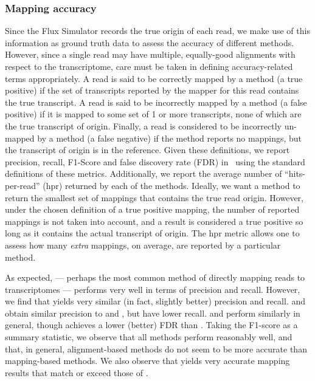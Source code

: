 \subsubsection{Mapping accuracy}
\label{subsec:synth_accuracy}

Since the Flux Simulator records the true origin of each read, we make use of this information as ground truth data to assess the accuracy of different methods. However, since a single read may have multiple, equally-good alignments with respect to the transcriptome, care must be taken in defining accuracy-related terms appropriately.  A read is said to be correctly mapped by a method (a true positive) if the set of transcripts reported by the mapper for this read contains the true transcript.  A read is said to be incorrectly mapped by a method (a false positive) if it is mapped to some set of 1 or more transcripts, none of which are the true transcript of origin.  Finally, a read is considered to be incorrectly un-mapped by a method (a false negative) if the method reports no mappings, but the transcript of origin is in the reference. Given these definitions, we report precision, recall, F1-Score and false discovery rate (FDR) in~ using the standard definitions of these metrics.  Additionally, we report the average number of ``hits-per-read'' (hpr) returned by each of the methods.  Ideally, we want a method to return the smallest set of mappings that contains the true read origin.  However, under the chosen definition of a true positive mapping, the number of reported mappings is not taken into account, and a result is considered a true positive so long as it contains the actual transcript of origin.  The hpr metric allows one to assess how many \textit{extra} mappings, on average, are reported by a particular method.

As expected, \bt --- perhaps the most common method of directly mapping reads to transcriptomes --- performs very well in terms of precision and recall.  However, we find that \rapmap yields very similar (in fact, slightly better) precision and recall.  \STAR and \kallisto obtain similar precision to \bt and \rapmap, but have lower recall.  \STAR and \kallisto perform similarly in general, though \kallisto achieves a lower (better) FDR than \STAR.  Taking the F1-score as a summary statistic, we observe that all methods perform reasonably well, and that, in general, alignment-based methods do not seem to be more accurate than mapping-based methods. We also observe that \rapmap yields very accurate mapping results that match or exceed those of \bt.

